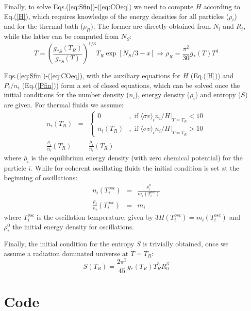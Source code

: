 \documentclass[preprint,notoc]{JHEP3}
\def\sigv{\langle \sigma v \rangle}
\def\To{\Rightarrow}
\begin{document}
Finally, to solve Eqs.(\ref{eq:Sfin})-(\ref{eq:COeq}) we need to compute $H$
according to Eq.(\ref{H}), which requires knowledge of the energy densities for all
particles ($\rho_i$) and for the thermal bath ($\rho_R$). The former are directly obtained from $N_i$ and $R_i$, while the latter can be
 computed from $N_S$:
\begin{equation}
T = \left(\frac{g_{*S}(T_R)}{g_{*S}(T)}\right)^{1/3} T_R \exp[N_S/3 -x] \To \rho_R = \frac{\pi^2}{30} g_{*}(T) T^4
\end{equation}

Eqs.(\ref{eq:Sfin})-(\ref{eq:COeq}), with the auxiliary equations for $H$
(Eq.(\ref{H})) and $P_i/n_i$ (Eq.(\ref{Pfin})) form a set of closed equations, which can be solved once the initial conditions for the number
density ($n_i$), energy density ($\rho_i$) and entropy ($S$) are given. For thermal fluids we assume:
\begin{eqnarray}
n_i(T_R) & = & \left\{ 
\begin{array}{ll} 
0 & , \mbox{ if $\sigv_i \bar{n}_i/H|_{T=T_R} < 10$} \\
\bar{n}_i(T_R) & , \mbox{ if $\sigv_i \bar{n}_i/H|_{T=T_R} > 10$} 
\end{array} \right. \label{ni0TP} \\
\frac{\rho_i}{n_i}(T_R) & = & \frac{\bar{\rho}_i}{\bar{n}_i}(T_R)
\end{eqnarray}
where $\bar{\rho}_i$ is the equilibrium energy density (with zero chemical potential) for the particle $i$.
While for coherent oscillating fluids the initial condition is set at the beginning of oscillations:
\begin{eqnarray}
n_i(T^{osc}_i) & = &\frac{\rho_i^{0}}{m_i(T^{osc}_i)} \\
\frac{\rho_i}{n_i}(T^{osc}_i) & = & m_i
\end{eqnarray}
where $T^{osc}_i$ is the oscillation temperature, given by $3H(T^{osc}_i) = m_i(T^{osc}_i)$ and $\rho_i^{0}$ the
initial energy density for oscillations.

Finally, the initial condition for the entropy $S$ is trivially obtained, once we assume a radiation dominated universe
at $T=T_R$:
\begin{equation}
S(T_R) = \frac{2 \pi^2}{45} g_*(T_R) T_R^3 R_0^3
\end{equation}



\section{Code}
\end{document}

